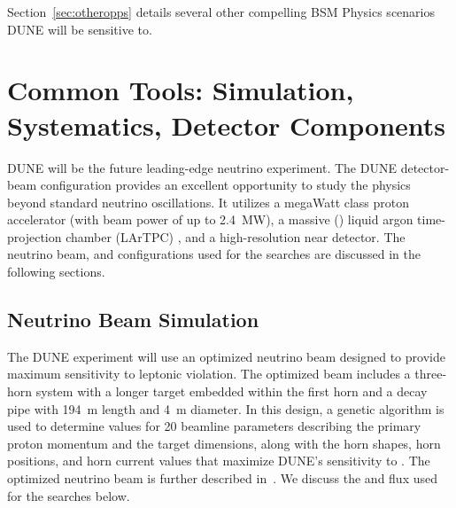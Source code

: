 Section~\ref{sec:otheropps} details several other compelling BSM Physics scenarios DUNE will be sensitive to.

\section{Common Tools: Simulation, Systematics, Detector Components}
\label{sec:tools}

DUNE will be the future leading-edge neutrino experiment. The DUNE detector-beam configuration provides an excellent opportunity to study the physics beyond standard neutrino
oscillations. It utilizes a megaWatt class proton accelerator (with beam power of up to \SI{2.4}{MW}), a massive (\fdfiducialmass) liquid argon time-projection chamber (LArTPC) , and a high-resolution near detector. The neutrino beam,  and  configurations used for the  searches are discussed in the following sections.

\subsection{Neutrino Beam Simulation}
\label{Nusim}
The DUNE experiment will use an optimized neutrino beam designed to provide maximum sensitivity to leptonic  violation. The optimized beam includes a three-horn system with a longer target embedded within the first horn and a decay pipe with \SI{194}{m} length and \SI{4}{m} diameter. In this design, a genetic algorithm is used to determine values for 20 beamline parameters describing the primary proton momentum and the target dimensions, along with the horn shapes, horn positions, and horn current values that maximize DUNE's sensitivity to . The optimized neutrino beam is further described in~\cite{Laura:2017}. We discuss the  and  flux used for the  searches below. 

